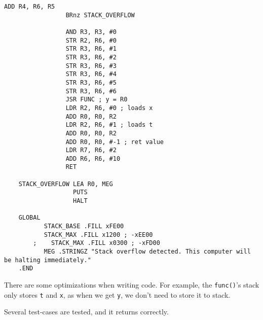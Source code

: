 \documentclass{article}
\begin{document}
\begin{lstlisting}[caption={Our code}]
	             ADD R4, R6, R5
	             BRnz STACK_OVERFLOW
	
	             AND R3, R3, #0
	             STR R2, R6, #0
	             STR R3, R6, #1 
	             STR R3, R6, #2 
	             STR R3, R6, #3 
	             STR R3, R6, #4 
	             STR R3, R6, #5 
	             STR R3, R6, #6
	             JSR FUNC ; y = R0
	             LDR R2, R6, #0 ; loads x
	             ADD R0, R0, R2
	             LDR R2, R6, #1 ; loads t
	             ADD R0, R0, R2
	             ADD R0, R0, #-1 ; ret value
	             LDR R7, R6, #2
	             ADD R6, R6, #10
	             RET
	
	STACK_OVERFLOW LEA R0, MEG
	               PUTS
	               HALT
	
	GLOBAL 
	       STACK_BASE .FILL xFE00
	       STACK_MAX .FILL x1200 ; -xEE00
	    ;    STACK_MAX .FILL x0300 ; -xFD00
	       MEG .STRINGZ "Stack overflow detected. This computer will be halting immediately."
	.END
	\end{lstlisting}
	
	There are some optimizations when writing code. For example, the \texttt{func()}'s stack only stores \texttt{t} and \texttt{x}, as when we get \texttt{y}, we don't need to store it to stack.
	
	Several test-cases are tested, and it returns correctly.
	
	
\end{document}
